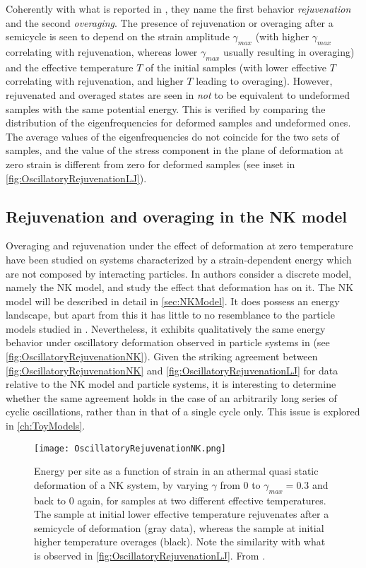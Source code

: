Coherently with what is reported in \cite{utz2000atomistic}, they name the first behavior \emph{rejuvenation} and the second \emph{overaging}. The presence of rejuvenation or overaging after a semicycle is seen to depend on the strain amplitude $\gamma_{max}$ (with higher $\gamma_{max}$ correlating with rejuvenation, whereas lower $\gamma_{max}$ usually resulting in overaging) and the effective temperature $T$ of the initial samples (with lower effective $T$ correlating with rejuvenation, and higher $T$ leading to overaging).
However, rejuvenated and overaged states are seen in \cite{lacks2004energy} \emph{not} to be equivalent to undeformed samples with the same potential energy. This is verified by comparing the distribution of the eigenfrequencies for deformed samples and undeformed ones. The average values of the eigenfrequencies do not coincide for the two sets of samples, and the value of the stress component in the plane of deformation at zero strain is different from zero for deformed samples (see inset in \autoref{fig:OscillatoryRejuvenationLJ}).

\subsection{Rejuvenation and overaging in the NK model}

Overaging and rejuvenation under the effect of deformation at zero temperature have been studied on systems characterized by a strain-dependent energy \cite{isner2006generic} which are not composed by interacting particles. In \cite{isner2006generic} authors consider a discrete model, namely the NK model, and study the effect that deformation has on it. The NK model will be described in detail in \autoref{sec:NKModel}. It does possess an energy landscape, but apart from this it has little to no resemblance to the particle models studied in \cite{utz2000atomistic, lacks2004energy}. Nevertheless, it exhibits qualitatively the same energy behavior under oscillatory deformation observed in particle systems in \cite{lacks2004energy} (see \autoref{fig:OscillatoryRejuvenationNK}). Given the striking agreement between \autoref{fig:OscillatoryRejuvenationNK} and \autoref{fig:OscillatoryRejuvenationLJ} for data relative to the NK model and particle systems, it is interesting to determine whether the same agreement holds in the case of an arbitrarily long series of cyclic oscillations, rather than in that of a single cycle only. This issue is explored in \autoref{ch:ToyModels}.  

\begin{figure} 
\centering 
\texttt{[image: OscillatoryRejuvenationNK.png]} 
\caption{Energy per site as a function of strain in an athermal quasi static deformation of a NK system, by varying $\gamma$ from $0$ to $\gamma_{max} = 0.3$ and back to $0$ again, for samples at two different effective temperatures. The sample at initial lower effective temperature rejuvenates after a semicycle of deformation (gray data), whereas the sample at initial higher temperature overages (black). Note the similarity with what is observed in \autoref{fig:OscillatoryRejuvenationLJ}. From \cite{isner2006generic}. \label{fig:OscillatoryRejuvenationNK}}
\end{figure}

